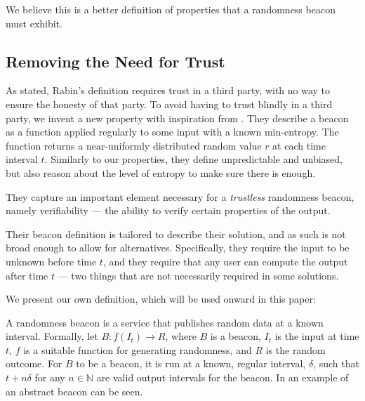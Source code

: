 We believe this is a better definition of properties that a randomness beacon must exhibit.

\subsection{Removing the Need for Trust}
As stated, Rabin's definition requires trust in a third party, with no way to ensure the honesty of that party.
To avoid having to trust blindly in a third party, we invent a new property with inspiration from \citet{bonneau2015bitcoin}.
They describe a beacon as a function applied regularly to some input with a known min-entropy.
The function returns a near-uniformly distributed random value $r$ at each time interval $t$.
Similarly to our properties, they define unpredictable and unbiased, but also reason about the level of entropy to make sure there is enough.

They capture an important element necessary for a \emph{trustless} randomness beacon, namely verifiability --- the ability to verify certain properties of the output.

Their beacon definition is tailored to describe their solution, and as such is not broad enough to allow for alternatives.
Specifically, they require the input to be unknown before time $t$, and they require that any user can compute the output after time $t$ --- two things that are not necessarily required in some solutions.

We present our own definition, which will be used onward in this paper:

A randomness beacon is a service that publishes random data at a known interval.
Formally, let $B: f(I_t) \rightarrow R$, where $B$ is a beacon, $I_t$ is the input at time $t$, $f$ is a suitable function for generating  randomness, and $R$  is the random outcome. %
For $B$ to be a beacon, it is run at a known, regular interval, $\delta$, such that $t+n\delta$ for any $n \in \mathbb{N}$ are valid output intervals for the beacon.
In  an example of an abstract beacon can be seen.

